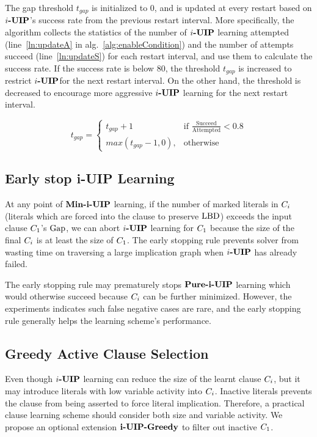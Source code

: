 \documentclass[runningheads]{llncs}
\begin{document}
The gap threshold $t_{gap}$ is initialized to 0, and is updated at
every restart based on $\textbf{$i$-UIP}$'s success rate from the previous
restart interval. More specifically, the algorithm collects the
statistics of the number of $\textbf{$i$-UIP}$ learning attempted
(line~\ref{ln:updateA} in alg.~\ref{alg:enableCondition}) and the
number of attempts succeed (line~\ref{ln:updateS}) for each restart
interval, and use them to calculate the success rate. If the success
rate is below 80, the threshold $t_{gap}$ is increased to restrict
$\textbf{$i$-UIP}$for the next restart interval. On the other hand, the threshold
is decreased to encourage more aggressive $\textbf{$i$-UIP}$ learning for the
next restart interval.

\[
    t_{gap}=
\begin{cases}
    t_{gap} + 1& \text{if } \frac{\text{Succeed}}{\text{Attempted}} < 0.8\\
    max(t_{gap} - 1, 0),              & \text{otherwise}
\end{cases}
\]

\subsection{Early stop i-UIP Learning}
At any point of $\textbf{Min-i-UIP}$ learning, if the number of marked literals
in $C_{i}$ (literals which are forced into the clause to
preserve $\text{LBD}$) exceeds the input clause $C_{1}$'s $\text{Gap}$, we
can abort $\textbf{$i$-UIP}$ learning for $C_{1}$ because the size of the
final $C_{i}$ is at least the size of $C_{1}$.  The
early stopping rule prevents solver from wasting time on traversing a
large implication graph when $\textbf{$i$-UIP}$ has already failed.

The early stopping rule may prematurely stops $\textbf{Pure-i-UIP}$ learning
which would otherwise succeed because $C_{i}$ can be further
minimized. However, the experiments indicates such false negative
cases are rare, and the early stopping rule generally helps the
learning scheme's performance.

\subsection{Greedy Active Clause Selection} \label{sec:greedy} Even
though $\textbf{$i$-UIP}$ learning can reduce the size of the learnt clause
$C_{i}$, but it may introduce literals with low variable
activity into $C_{i}$.  Inactive literals prevents the clause
from being asserted to force literal implication. Therefore, a
practical clause learning scheme should consider both size and
variable activity. We propose an optional extension $\textbf{i-UIP-Greedy}$ to
filter out inactive $C_{1}$.
\end{document}
